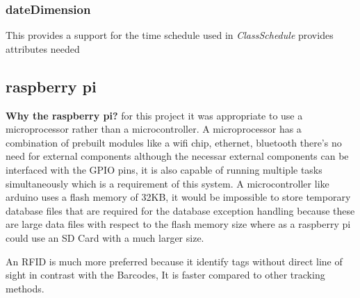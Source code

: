 \subsubsection{dateDimension}
This provides a support for the time schedule used in \textit{ClassSchedule} provides attributes needed 

\subsection{raspberry pi}
\textbf{Why the raspberry pi?} for this project it was appropriate to use a microprocessor rather than a microcontroller. A microprocessor has a combination of prebuilt modules like a wifi chip, ethernet, bluetooth there's no need for external components although the necessar external components can be interfaced with the GPIO pins, it is also capable of running multiple tasks simultaneously which is a requirement of this system. A microcontroller like arduino uses a flash memory of 32KB, it would be impossible to store temporary database files that are required for the database exception handling because these are large data files with respect to the flash memory size where as a raspberry pi could use an SD Card with a much larger size.

An RFID is much more preferred because it identify tags without direct line of sight in contrast with the Barcodes, It is faster compared to other tracking methods.

